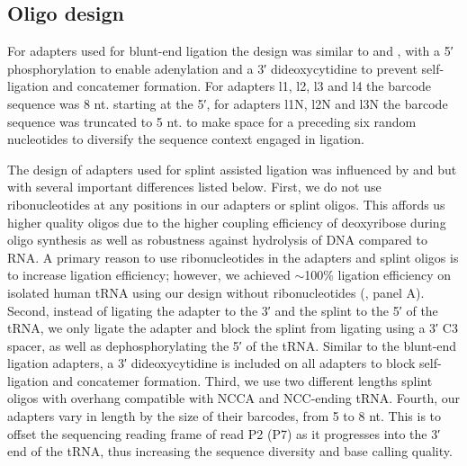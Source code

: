 \documentclass[9pt,lineno]{elife}
\begin{document}
\subsection{Oligo design}
For adapters used for blunt-end ligation the design was similar to \cite{McGlincy2017-ro} and \cite{Behrens2021-gb}, with a 5′ phosphorylation to enable adenylation and a 3′ dideoxycytidine to prevent self-ligation and concatemer formation.
For adapters l1, l2, l3 and l4 the barcode sequence was 8 nt. starting at the 5′, for adapters l1N, l2N and l3N the barcode sequence was truncated to 5 nt. to make space for a preceding six random nucleotides to diversify the sequence context engaged in ligation.

The design of adapters used for splint assisted ligation was influenced by \cite{Smith2015-ht} and \cite{Shigematsu2017-tv} but with several important differences listed below.
First, we do not use ribonucleotides at any positions in our adapters or splint oligos.
This affords us higher quality oligos due to the higher coupling efficiency of deoxyribose during oligo synthesis as well as robustness against hydrolysis of DNA compared to RNA.
A primary reason to use ribonucleotides in the adapters and splint oligos is to increase ligation efficiency; however, we achieved $\sim$100\% ligation efficiency on isolated human tRNA using our design without ribonucleotides (, panel A).
Second, instead of ligating the adapter to the 3′ and the splint to the 5′ of the tRNA, we only ligate the adapter and block the splint from ligating using a 3′ C3 spacer, as well as dephosphorylating the 5′ of the tRNA.
Similar to the blunt-end ligation adapters, a 3′ dideoxycytidine is included on all adapters to block self-ligation and concatemer formation.
Third, we use two different lengths splint oligos with overhang compatible with NCCA and NCC-ending tRNA.
Fourth, our adapters vary in length by the size of their barcodes, from 5 to 8 nt.
This is to offset the sequencing reading frame of read P2 (P7) as it progresses into the 3′ end of the tRNA, thus increasing the sequence diversity and base calling quality.
\end{document}
